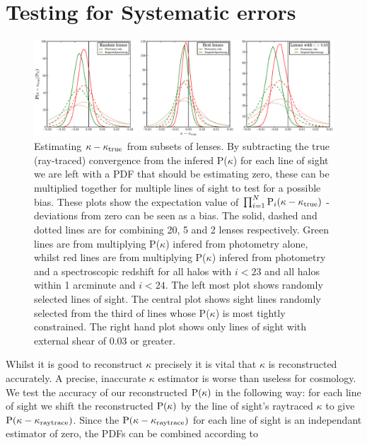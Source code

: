 \documentclass[useAMS,usenatbib]{mn2e}
\begin{document}


\section{Testing for Systematic errors}
\label{sec:biases}
\begin{figure}
\includegraphics[width=\textwidth]{figs/biasplots.eps}
\caption[magcut]{Estimating $\kappa-\kappa_{\rm true}$ from subsets of
lenses. By subtracting the true (ray-traced) convergence from the
infered P($\kappa$) for each line of sight we are left with a PDF that
should be estimating zero, these can be multiplied together for multiple
lines of sight to test for a possible bias. These plots show the
expectation value of $\prod_{i=1}^N {\rm P}_i(\kappa-\kappa_{\rm true})$ -
deviations from zero can be seen as a bias. The solid, dashed and dotted
lines are for combining 20, 5 and 2 lenses respectively. Green lines are
from multiplying P($\kappa$) infered from photometry alone, whilst red
lines are from multiplying P($\kappa$) infered from photometry and a
spectroscopic redshift for all halos with $i<23$ and all halos within 1
arcminute and $i<24$. The left most plot shows randomly selected lines
of sight. The central plot shows sight lines randomly selected from the
third of lines whose P($\kappa$) is most tightly constrained. The right
hand plot shows only lines of sight with external shear of 0.03 or
greater.}
\label{fig:biasplots}
\end{figure}

Whilst it is good to reconstruct $\kappa$ precisely it is vital that $\kappa$ is reconstructed accurately. A precise, inaccurate $\kappa$ estimator is worse than useless for cosmology. We test the accuracy of our reconstructed ${\rm P}(\kappa)$ in the following way: for each line of sight we shift the reconstructed ${\rm P}(\kappa)$ by the line of sight's raytraced $\kappa$ to give ${\rm P}(\kappa-\kappa_{\rm raytrace})$. Since the ${\rm P}(\kappa-\kappa_{\rm raytrace})$ for each line of sight is an independant estimator of zero, the PDFs can be combined according to
\end{document}
